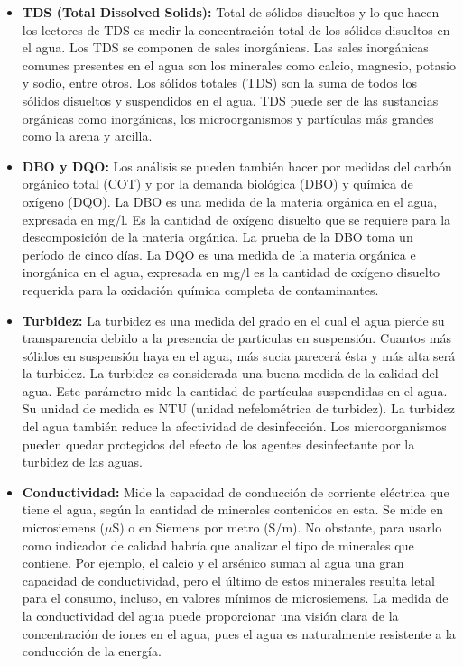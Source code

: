 \documentclass[conference]{IEEEtran}
\begin{document}
		\begin{itemize}
		\item \textbf{TDS (Total Dissolved Solids):} Total de sólidos disueltos y lo que hacen los lectores de TDS es medir la concentración total de los sólidos disueltos en el agua. Los TDS se componen de sales inorgánicas. Las sales inorgánicas comunes presentes en el agua son los minerales como calcio, magnesio, potasio y sodio, entre otros. Los sólidos totales (TDS) son la suma de todos los sólidos disueltos y suspendidos en el agua. TDS puede ser de las sustancias orgánicas como inorgánicas, los microorganismos y partículas más grandes como la arena y arcilla.
		
		\item \textbf{DBO y DQO:} Los análisis se pueden también hacer por medidas del carbón orgánico total (COT) y por la demanda biológica (DBO) y química de oxígeno (DQO). La DBO es una medida de la materia orgánica en el agua, expresada en mg/l. Es la cantidad de oxígeno disuelto que se requiere para la descomposición de la materia orgánica. La prueba de la DBO toma un período de cinco días. La DQO es una medida de la materia orgánica e inorgánica en el agua, expresada en mg/l es la cantidad de oxígeno disuelto requerida para la oxidación química completa de contaminantes.
		
		\item \textbf{Turbidez:} La turbidez es una medida del grado en el cual el agua pierde su transparencia debido a la presencia de partículas en suspensión. Cuantos más sólidos en suspensión haya en el agua, más sucia parecerá ésta y más alta será la turbidez. La turbidez es considerada una buena medida de la calidad del agua. Este parámetro mide la cantidad de partículas suspendidas en el agua. Su unidad de medida es NTU (unidad nefelométrica de turbidez). La turbidez del agua también reduce la afectividad de desinfección. Los microorganismos pueden quedar protegidos del efecto de los agentes desinfectante por la turbidez de las aguas.
		
		
		\item \textbf{Conductividad:} Mide la capacidad de conducción de corriente eléctrica que tiene el agua, según la cantidad de minerales contenidos en esta. Se mide en microsiemens ($\mu$S) o en Siemens por metro (S/m). No obstante, para usarlo como indicador de calidad habría que analizar el tipo de minerales que contiene. Por ejemplo, el calcio y el arsénico suman al agua una gran capacidad de conductividad, pero el último de estos minerales resulta letal para el consumo, incluso, en valores mínimos de microsiemens. La medida de la conductividad del agua puede proporcionar una visión clara de la concentración de iones en el agua, pues el agua es naturalmente resistente a la conducción de la energía.
			

\end{itemize}
\end{document}
